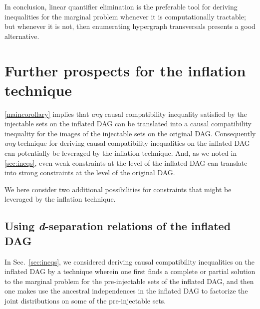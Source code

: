 In conclusion, linear quantifier elimination is the preferable tool for deriving inequalities for the marginal problem whenever it is computationally tractable; but whenever it is not, then enumerating hypergraph transversals presents a good alternative. %





\section{Further prospects for the inflation technique}\label{sec:otherprospects}

\cref{maincorollary} implies that {\em any} causal compatibility inequality satisfied by the injectable sets on the inflated DAG can be translated into a causal compatibility inequality for the images of the injectable sets on the original DAG. Consequently {\em any} technique for deriving causal compatibility inequalities on the inflated DAG can potentially be leveraged by the inflation technique.  And, as we noted in \cref{sec:ineqs}, even weak constraints at the level of the inflated DAG can translate into strong constraints at the level of the original DAG. 

We here consider two additional possibilities for constraints that might be leveraged by the inflation technique.

\subsection{Using \textit{d}-separation relations of the inflated DAG}\label{sec:fulldsep}

In Sec.~\ref{sec:ineqs}, we considered deriving causal compatibility inequalities on the inflated DAG by a technique wherein one first finds a complete or partial solution to the marginal problem for the pre-injectable sets of the inflated DAG, and then one makes use the ancestral independences in the inflated DAG to factorize the joint distributions on some of the pre-injectable sets.

